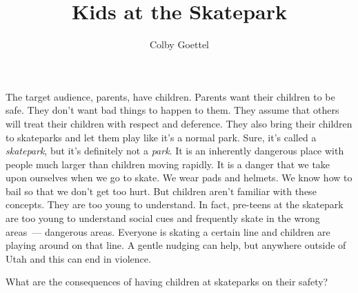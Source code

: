 \documentclass[12pt]{article}
\title{Kids at the Skatepark}
\author{Colby Goettel}
\begin{document}
\maketitle



The target audience, parents, have children. Parents want their children to be safe. They don't want bad things to happen to them. They assume that others will treat their children with respect and deference. They also bring their children to skateparks and let them play like it's a normal park. Sure, it's called a \textit{skatepark}, but it's definitely not a \textit{park}. It is an inherently dangerous place with people much larger than children moving rapidly. It is a danger that we take upon ourselves when we go to skate. We wear pads and helmets. We know how to bail so that we don't get too hurt. But children aren't familiar with these concepts. They are too young to understand. In fact, pre-teens at the skatepark are too young to understand social cues and frequently skate in the wrong areas~--- dangerous areas. Everyone is skating a certain line and children are playing around on that line. A gentle nudging can help, but anywhere outside of Utah and this can end in violence.




What are the consequences of having children at skateparks on their safety?

\end{document}

